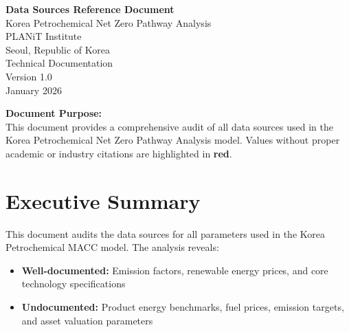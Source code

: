 \documentclass[12pt,a4paper]{article}
\begin{document}
\begin{titlepage}
\centering
\vspace*{2cm}

{\LARGE\bfseries Data Sources Reference Document}\\[0.5cm]
{\Large Korea Petrochemical Net Zero Pathway Analysis}\\[2cm]

{\large PLANiT Institute}\\
{\normalsize Seoul, Republic of Korea}\\[1cm]

{\large Technical Documentation}\\[0.5cm]
{\normalsize Version 1.0}\\[2cm]

{\large January 2026}\\[2cm]

\vfill

\begin{center}
\end{center}

\vfill

{\small
\textbf{Document Purpose:}\\
This document provides a comprehensive audit of all data sources used in the Korea Petrochemical Net Zero Pathway Analysis model. Values without proper academic or industry citations are highlighted in \textcolor{sourcered}{\textbf{red}}.
}
\end{titlepage}

\tableofcontents
\newpage

\section{Executive Summary}

This document audits the data sources for all parameters used in the Korea Petrochemical MACC model. The analysis reveals:

\begin{itemize}
    \item \textbf{Well-documented:} Emission factors, renewable energy prices, and core technology specifications
    \item \textcolor{sourcered}{\textbf{Undocumented:}} Product energy benchmarks, fuel prices, emission targets, and asset valuation parameters
\end{itemize}
\end{document}
